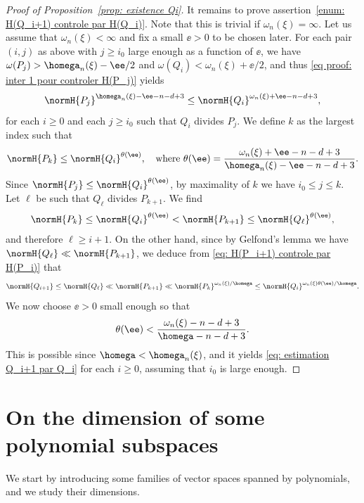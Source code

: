 \begin{proof}[Proof of Proposition~\ref{prop: existence Qi}]
It remains to prove assertion~\eqref{enum: H(Q_i+1) controle par H(Q_i)}. Note that this is trivial if $\omega_n(\xi) = \infty$. Let us assume that $\omega_n(\xi) < \infty$ and fix a small $\ee > 0$ to be chosen later. For each pair $(i,j)$ as above with $j \geq i_0$ large enough as a function of $\ee$, we have $\omega(P_j) > \homega_n(\xi)-\ee/2$ and $\omega(Q_i) < \omega_n(\xi)+\ee/2$, and thus \eqref{eq proof: inter 1 pour controler H(P_j)} yields
\begin{equation*}
\normH{P_j}^{\homega_n(\xi)-\ee-n-d+3} \leq \normH{Q_i}^{\omega_n(\xi)+\ee-n-d+3},
\end{equation*}
for each $i \geq 0$ and each $j\geq i_0$ such that $Q_i$ divides $P_j$. We define $k$ as the largest index such that
\begin{equation*}
\normH{P_k} \leq \normH{Q_i}^{\theta(\ee)},\quad \textrm{where } \theta(\ee) = \frac{\omega_n(\xi)+\ee-n-d+3}{\homega_n(\xi)-\ee-n-d+3}.
\end{equation*}
Since $\normH{P_j} \leq \normH{Q_i}^{\theta(\ee)}$, by maximality of $k$ we have $i_0\leq j\leq k$. Let $\ell$ be such that $Q_\ell$ divides $P_{k+1}$. We find
\begin{equation*}
\normH{P_k} \leq \normH{Q_i}^{\theta(\ee)} < \normH{P_{k+1}} \leq \normH{Q_\ell}^{\theta(\ee)},
\end{equation*}
and therefore $\ell \geq i+1$. On the other hand, since by Gelfond's lemma we have $\normH{Q_\ell} \ll \normH{P_{k+1}}$, we deduce from \eqref{eq: H(P_i+1) controle par H(P_i)} that
\begin{equation*}
\normH{Q_{i+1}} \leq \normH{Q_\ell} \ll \normH{P_{k+1}} \ll \normH{P_k}^{\omega_n(\xi)/\homega}\leq \normH{Q_i}^{\omega_n(\xi)\theta(\ee) /\homega}.
\end{equation*}
We now choose $\ee>0$ small enough so that
\begin{equation*}
\theta(\ee) < \frac{\omega_n(\xi)-n-d+3}{\homega -n-d+3}.
\end{equation*}
This is possible since $\homega < \homega_n(\xi)$, and it yields \eqref{eq: estimation Q_i+1 par Q_i} for each $i\geq 0$, assuming that $i_0$ is large enough.
\end{proof}

\section{On the dimension of some polynomial subspaces}
\label{section: espaces V_N}

We start by introducing some families of vector spaces spanned by polynomials, and we study their dimensions.

